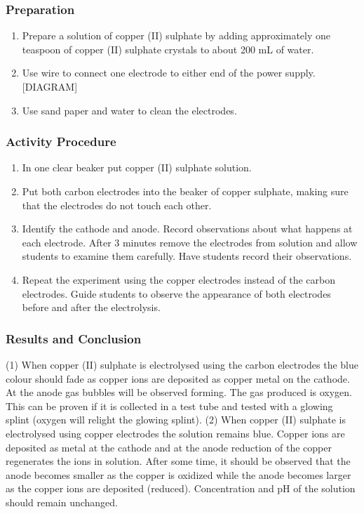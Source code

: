 \subsubsection*{Preparation}
\begin{enumerate}
\item{Prepare a solution of copper (II) sulphate by adding approximately one teaspoon of copper (II) sulphate crystals to about 200 mL of water.}
\item{Use wire to connect one electrode to either end of the power supply. [DIAGRAM]}
\item{Use sand paper and water to clean the electrodes.}
\end{enumerate}

\subsubsection*{Activity Procedure}
\begin{enumerate}
\item{In one clear beaker put copper (II) sulphate solution.}
\item{Put both carbon electrodes into the beaker of copper sulphate, making sure that the electrodes do not touch each other.}
\item{Identify the cathode and anode. Record observations about what happens at each electrode. After 3 minutes remove the electrodes from solution and allow students to examine them carefully. Have students record their observations.}
\item{Repeat the experiment using the copper electrodes instead of the carbon electrodes. Guide students to observe the appearance of both electrodes before and after the electrolysis.}
\end{enumerate}

\subsubsection*{Results and Conclusion}
(1) When copper (II) sulphate is electrolysed using the carbon electrodes the blue colour should fade as copper ions are deposited as copper metal on the cathode.  At the anode gas bubbles will be observed forming. The gas produced is oxygen. This can be proven if it is collected in a test tube and tested with a glowing splint (oxygen will relight the glowing splint).
(2) When copper (II) sulphate is electrolysed using copper electrodes the solution remains blue. Copper ions are deposited as metal at the cathode and at the anode reduction of the copper regenerates the ions in solution. After some time, it should be observed that the anode becomes smaller as the copper is oxidized while the anode becomes larger as the copper ions are deposited (reduced). Concentration and pH of the solution should remain unchanged.

